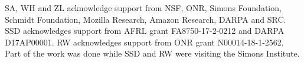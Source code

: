  SA, WH and ZL acknowledge support from NSF, ONR, Simons Foundation, Schmidt Foundation, Mozilla Research, Amazon Research, DARPA and SRC.
 SSD acknowledges support from AFRL grant FA8750-17-2-0212 and DARPA D17AP00001.
 RW acknowledges support from ONR grant N00014-18-1-2562.
 Part of the work was done while SSD and RW were visiting the Simons Institute.